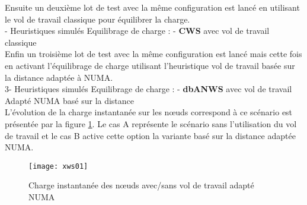Ensuite un deuxième lot de test avec la même configuration est lancé en utilisant le vol de travail classique pour équilibrer la charge. \\
- Heuristiques simulés Equilibrage de charge : - \textbf{CWS} avec vol de travail classique\\

Enfin un troisième lot de test avec la même configuration est lancé mais cette fois en activant l'équilibrage de charge utilisant l'heuristique vol de travail basée sur la distance adaptée à NUMA. \\
3- Heuristiques simulés Equilibrage de charge : - \textbf{dbANWS} avec vol de travail Adapté NUMA basé sur la distance\\

L'évolution de la charge instantanée sur les nœuds correspond à ce scénario est présentée par la figure \ref{fig:xws01}. Le cas A représente le scénario sans l'utilisation du vol de travail et le cas B active cette option la variante basé sur la distance adaptée NUMA. 
%
\begin{figure} %
\texttt{[image: xws01]}
\centering
\caption{Charge instantanée des nœuds avec/sans vol de travail adapté NUMA}
\label{fig:xws01}
\end{figure}
%
